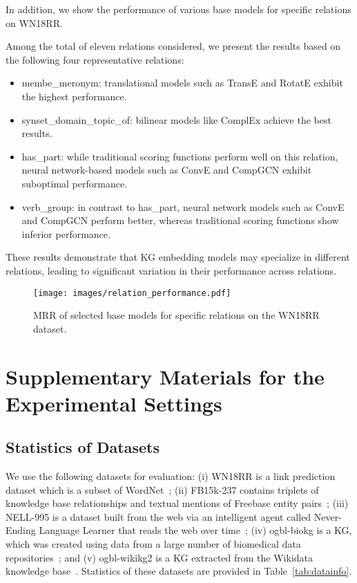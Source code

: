\documentclass[11pt,a4paper]{article}
\begin{document}
  In addition, we show the performance of various base models for specific relations
  on WN18RR.
  
  Among the total of eleven relations considered, 
  we present the results based on the following four representative relations:
  \begin{itemize}
    \item 
     membe\_meronym: translational models such as TransE and RotatE exhibit the highest performance.
    \item
     synset\_domain\_topic\_of: bilinear models like ComplEx achieve the best results.
    \item 
     has\_part: while traditional scoring functions perform well on this relation, neural network-based models such as ConvE and CompGCN exhibit suboptimal performance.
    \item 
     verb\_group: in contrast to has\_part, neural network models such as ConvE and CompGCN perform better, whereas traditional scoring functions show inferior performance.
  \end{itemize}
  These results demonstrate that KG embedding models may specialize in different relations,
  leading to significant variation in their performance across relations.
  
  \begin{figure}[H]
    \centering
\texttt{[image: images/relation\_performance.pdf]}
\caption{MRR of selected base models for specific relations on the WN18RR dataset.}
\label{fig:relation_mrr}
  \end{figure}
  
  
  \section{Supplementary Materials for the Experimental Settings}
  
  \subsection{Statistics of Datasets}
  \label{app:datasets}
  
  
  We use the following datasets for evaluation:
  (i) WN18RR is a link prediction dataset which is a subset of WordNet~\cite{dettmers2018convolutional};
  (ii) FB15k-237 contains triplets of knowledge base relationships and textual mentions of Freebase entity pairs~\cite{toutanova2015observed};
  (iii) NELL-995 is a dataset built from the web via an intelligent agent called Never-Ending Language Learner
  that reads the web over time~\cite{xiong2017deeppath};
  (iv) ogbl-biokg is a KG, which was created using data from a large number of biomedical data repositories~\cite{hu2020open};
  and (v) ogbl-wikikg2 is a KG extracted from the Wikidata knowledge base~\cite{hu2020open}.
  Statistics of these datasets are provided in Table~\ref{tab:datainfo}.
  
\end{document}
